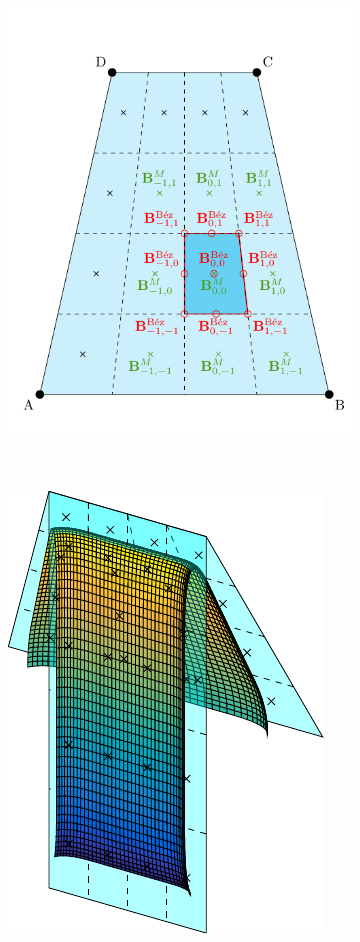 \begin{figure}
\begin{center}
\begin{subfigure}[b]{.49\textwidth}
\begin{center}
\includegraphics[width=.9\textwidth]{Pictures/NURBS/bezier_points.pdf}
\label{subfig:peterspoints}
\end{center}
\end{subfigure}
~
\begin{subfigure}[b]{.49\textwidth}
\begin{center}
\includegraphics[height=\textwidth]{Pictures/NURBS/bspline_patches.pdf}

\end{center}
\end{subfigure}
\end{center}
\end{figure}
